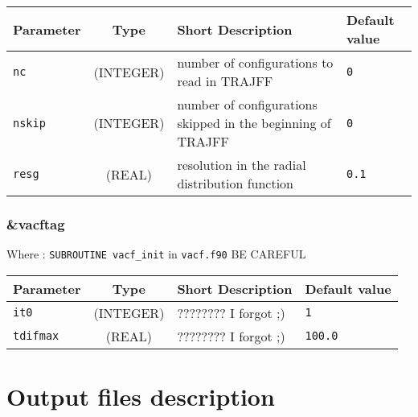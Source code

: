 \documentclass[a4paper]{article}
\begin{document}
\begin{longtable}{l|c|m{8cm}|m{2cm}}
\hline
\hline
Parameter        &  Type              &          Short Description                                                          & Default value \\
\hline
\hline
\rule[-0.75cm]{0cm}{1.5cm}
\verb?nc?        & (INTEGER)          & number of configurations to read in TRAJFF                                          & \verb?0? \\
\rule[-0.75cm]{0cm}{1.5cm}
\verb?nskip?     & (INTEGER)          & number of configurations skipped in the beginning of TRAJFF                         & \verb?0? \\
\rule[-0.75cm]{0cm}{1.5cm}
\verb?resg?      & (REAL)             & resolution in the radial distribution function                                      & \verb?0.1? \\
\hline
\hline
\end{longtable}

\subsubsection{\&vacftag}

Where : \verb?SUBROUTINE vacf_init? in \verb?vacf.f90?
BE CAREFUL
\newline

\begin{longtable}{l|c|m{8cm}|m{2cm}}
\hline
\hline
Parameter        &  Type              &          Short Description                                                          & Default value \\
\hline
\hline
\rule[-0.75cm]{0cm}{1.5cm}
\verb?it0?       & (INTEGER)          & ???????? I forgot ;)                                                                & \verb?1? \\
\hline
\rule[-0.75cm]{0cm}{1.5cm}
\verb?tdifmax?   & (REAL)             & ???????? I forgot ;)                                                                & \verb?100.0? \\ 
\hline
\hline
\end{longtable}


\section{Output files description}



\end{document}
